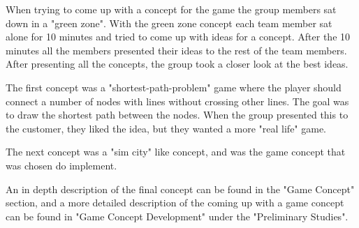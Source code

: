 	When trying to come up with a concept for the game the group members sat down in a "green zone". 
	With the green zone concept each team member sat alone for 10 minutes and tried to come up with 
	ideas for a concept. After the 10 minutes all the members presented their ideas to the rest of 
	the team members. After presenting all the concepts, the group took a closer look at the best ideas. 

	The first concept was a "shortest-path-problem" game where the player should
	connect a number of nodes with lines without crossing other lines. The goal 
	was to draw the shortest path between the nodes. When the group presented this
	to the customer, they liked the idea, but they wanted a more "real life" game.

	The next concept was a "sim city" like concept, and was the game concept that
	was chosen do implement. 

	An in depth description of the final concept can be found in the "Game Concept"
	section, and a more detailed description of the coming up with a game concept can 
	be found in "Game Concept Development" under the "Preliminary Studies". 

